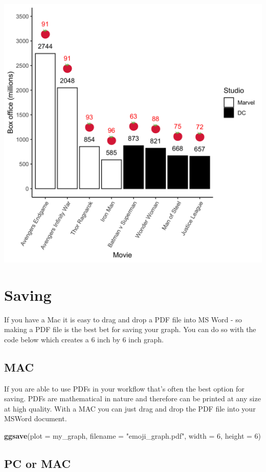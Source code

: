\documentclass[
]{krantz}
\makeatletter
\newenvironment{Shaded}{\begin{snugshade}}{\end{snugshade}}
\newcommand{\DataTypeTok}[1]{\textcolor[rgb]{0.27,0.27,0.27}{#1}}
\newcommand{\DecValTok}[1]{\textcolor[rgb]{0.06,0.06,0.06}{#1}}
\newcommand{\KeywordTok}[1]{\textcolor[rgb]{0.27,0.27,0.27}{\textbf{#1}}}
\newcommand{\NormalTok}[1]{#1}
\newcommand{\StringTok}[1]{\textcolor[rgb]{0.5,0.5,0.5}{#1}}
\newenvironment{kframe}{%
\medskip{}
\setlength{\fboxsep}{.8em}
 \def\at@end@of@kframe{}%
 \ifinner\ifhmode%
  \def\at@end@of@kframe{\end{minipage}}%
  \begin{minipage}{\columnwidth}%
 \fi\fi%
 \def\FrameCommand##1{\hskip\@totalleftmargin \hskip-\fboxsep
 \colorbox{shadecolor}{##1}\hskip-\fboxsep
     \hskip-\linewidth \hskip-\@totalleftmargin \hskip\columnwidth}%
 \MakeFramed {\advance\hsize-\width
   \@totalleftmargin\z@ \linewidth\hsize
   \@setminipage}}%
 {\par\unskip\endMakeFramed%
 \at@end@of@kframe}
\renewenvironment{Shaded}{\begin{kframe}}{\end{kframe}}
\makeatother
\begin{document}
\includegraphics[width=0.65\linewidth]{ch_graphing/images/emoji_graph3}

\hypertarget{saving}{%
\section{Saving}\label{saving}}

If you have a Mac it is easy to drag and drop a PDF file into MS Word - so making a PDF file is the best bet for saving your graph. You can do so with the code below which creates a 6 inch by 6 inch graph.

\hypertarget{mac}{%
\subsection{MAC}\label{mac}}

If you are able to use PDFs in your workflow that's often the best option for saving. PDFs are mathematical in nature and therefore can be printed at any size at high quality. With a MAC you can just drag and drop the PDF file into your MSWord document.

\begin{Shaded}
\begin{Highlighting}[]
\KeywordTok{ggsave}\NormalTok{(}\DataTypeTok{plot =}\NormalTok{ my_graph, }
       \DataTypeTok{filename =} \StringTok{"emoji_graph.pdf"}\NormalTok{, }
       \DataTypeTok{width =} \DecValTok{6}\NormalTok{, }
       \DataTypeTok{height =} \DecValTok{6}\NormalTok{)}
\end{Highlighting}
\end{Shaded}

\hypertarget{pc-or-mac}{%
\subsection{PC or MAC}\label{pc-or-mac}}
\end{document}
